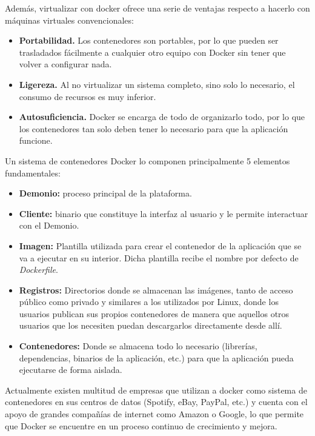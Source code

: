 Además, virtualizar con docker ofrece una serie de ventajas respecto a hacerlo con máquinas virtuales convencionales\cite{velazco2016}:

\begin{itemize}
	\item \textbf{Portabilidad.} Los contenedores son portables, por lo que pueden ser trasladados fácilmente a cualquier otro equipo con Docker sin tener que volver a configurar nada.
	\item \textbf{Ligereza.} Al no virtualizar un sistema completo, sino solo lo necesario, el consumo de recursos es muy inferior.
	\item \textbf{Autosuficiencia.} Docker se encarga de todo de organizarlo todo, por lo que los contenedores tan solo deben tener lo necesario para que la aplicación funcione.
\end{itemize}

Un sistema de contenedores Docker lo componen principalmente 5 elementos fundamentales:

\begin{itemize}
	\item \textbf{Demonio:} proceso principal de la plataforma.
	\item \textbf{Cliente:} binario que constituye la interfaz al usuario y le permite interactuar con el Demonio.
	\item \textbf{Imagen:} Plantilla utilizada para crear el contenedor de la aplicación que se va a ejecutar en su interior. Dicha plantilla recibe el nombre por defecto de \textit{Dockerfile}.
	\item \textbf{Registros:} Directorios donde se almacenan las imágenes, tanto de acceso público como privado y similares a los utilizados por Linux, donde los usuarios publican sus propios contenedores de manera que aquellos otros usuarios que los necesiten puedan descargarlos directamente desde allí.
	\item \textbf{Contenedores:} Donde se almacena todo lo necesario (librerías, dependencias, binarios de la aplicación, etc.) para que la aplicación pueda ejecutarse de forma aislada.
\end{itemize}

Actualmente existen multitud de empresas que utilizan a docker como sistema de contenedores en sus centros de datos (Spotify, eBay, PayPal, etc.) y cuenta con el apoyo de grandes compañías de internet como Amazon o Google, lo que permite que Docker se encuentre en un proceso continuo de crecimiento y mejora.


